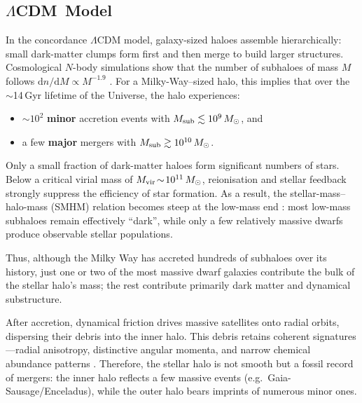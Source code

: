 \documentclass[a4paper,12pt]{article}
\begin{document}
\subsection{$\Lambda$CDM\, Model}
\label{subsec:LCDM_halo}

In the concordance $\Lambda$CDM model, galaxy-sized haloes assemble hierarchically:  
small dark-matter clumps form first and then merge to build larger structures.  
Cosmological $N$-body simulations show that the number of subhaloes of mass $M$ follows  
$\mathrm{d}n/\mathrm{d}M \propto M^{-1.9}$ \citep{Springel2008}.  
For a Milky-Way–sized halo, this implies that over the $\sim$14\,Gyr lifetime of the Universe, the halo experiences:
\begin{itemize}
    \item ${\sim}10^{2}$ \textbf{minor} accretion events with $M_{\rm sub}\lesssim10^{9}\,M_\odot$, and 
    \item a few \textbf{major} mergers with $M_{\rm sub}\gtrsim10^{10}\,M_\odot$.
\end{itemize}
  

Only a small fraction of dark-matter haloes form significant numbers of stars.  
Below a critical virial mass of $M_{\rm vir}\!\sim\!10^{11}\,M_\odot$, reionisation and stellar feedback 
strongly suppress the efficiency of star formation.  
As a result, the stellar-mass–halo-mass (SMHM) relation becomes steep at the low-mass end 
\citep{Purcell2007,BullockBoylanKolchin2017}:  
most low-mass subhaloes remain effectively ``dark'', while only a few relatively massive dwarfs 
produce observable stellar populations.

Thus, although the Milky Way has accreted hundreds of subhaloes over its history,  
just one or two of the most massive dwarf galaxies contribute the bulk of the stellar halo’s mass;  
the rest contribute primarily dark matter and dynamical substructure.

After accretion, dynamical friction drives massive satellites onto radial orbits, dispersing 
their debris into the inner halo. This debris retains coherent signatures—radial anisotropy,
distinctive angular momenta, and narrow chemical abundance patterns \citep[e.g.][]{HelmiDeZeeuw2000}. 
Therefore, the stellar halo is not smooth but a fossil record of mergers: the inner halo reflects a 
few massive events (e.g.\ Gaia-Sausage/Enceladus), while the outer halo bears imprints of numerous 
minor ones.

\end{document}
